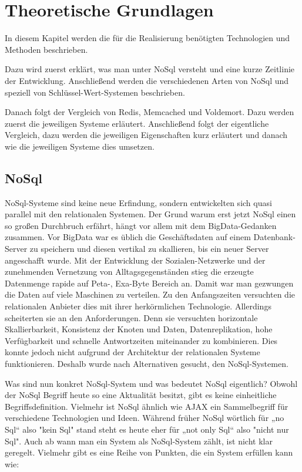 \chapter{Theoretische Grundlagen}
In diesem Kapitel werden die für die Realisierung benötigten Technologien und
Methoden beschrieben.

Dazu wird zuerst erklärt, was man unter NoSql versteht und eine kurze Zeitlinie
der Entwicklung. Anschließend werden die verschiedenen Arten von NoSql und
speziell von Schlüssel-Wert-Systemen beschrieben.

Danach folgt der Vergleich von Redis, Memcached und Voldemort. Dazu werden
zuerst die jeweiligen Systeme erläutert. Anschließend folgt der eigentliche
Vergleich, dazu werden die jeweiligen Eigenschaften kurz erläutert und danach
wie die jeweiligen Systeme dies umsetzen.

\section{NoSql}
NoSql-Systeme sind keine neue Erfindung, sondern entwickelten sich quasi
parallel mit den relationalen Systemen. Der Grund warum erst jetzt NoSql einen
so großen Durchbruch erfährt, hängt vor allem mit dem \gls{BigData}-Gedanken
zusammen. Vor BigData war es üblich die Geschäftsdaten auf einem
Datenbank-Server zu speichern und diesen vertikal zu skallieren, bis ein neuer
Server angeschafft wurde. Mit der Entwicklung der Sozialen-Netzwerke und der
zunehmenden Vernetzung von Alltagsgegenständen stieg die erzeugte Datenmenge
rapide auf Peta-, Exa-Byte Bereich an. Damit war man gezwungen die Daten auf
viele Maschinen zu verteilen. Zu den Anfangszeiten versuchten die relationalen
Anbieter dies mit ihrer herkörmlichen Technologie. Allerdings scheiterten sie an
den Anforderungen. Denn sie versuchten horizontale Skallierbarkeit, Konsistenz
der Knoten und Daten, Datenreplikation, hohe Verfügbarkeit und schnelle
Antwortzeiten miteinander zu kombinieren. Dies konnte jedoch nicht aufgrund der
Architektur der relationalen Systeme funktionieren. Deshalb wurde nach
Alternativen gesucht, den NoSql-Systemen.

Was sind nun konkret NoSql-System und was bedeutet NoSql eigentlich? Obwohl der
NoSql Begriff heute so eine Aktualität besitzt, gibt es keine einheitliche
Begriffsdefinition. Vielmehr ist NoSql ähnlich wie \gls{AJAX} ein Sammelbegriff
für verschiedene Technologien und Ideen. Während früher NoSql wörtlich
für „no Sql“ also "kein Sql" stand steht es heute eher für „not only Sql“ also
"nicht nur Sql". Auch ab wann man ein System als NoSql-System zählt, ist nicht
klar geregelt. Vielmehr gibt es eine Reihe von Punkten, die ein System erfüllen
kann wie: \cite{Edlich2011}

